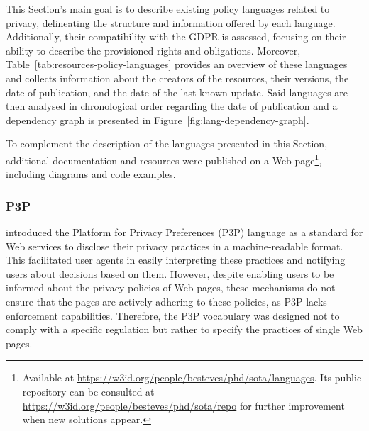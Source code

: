 This Section's main goal is to describe existing policy languages related to privacy, delineating the structure and information offered by each language.
Additionally, their compatibility with the GDPR is assessed, focusing on their ability to describe the provisioned rights and obligations.
Moreover, Table~\ref{tab:resources-policy-languages} provides an overview of these languages and collects information about the creators of the resources, their versions, the date of publication, and the date of the last known update.
Said languages are then analysed in chronological order regarding the date of publication and a dependency graph is presented in Figure~\ref{fig:lang-dependency-graph}.

To complement the description of the languages presented in this Section, additional documentation and resources were published on a Web page\footnote{Available at \url{https://w3id.org/people/besteves/phd/sota/languages}. Its public repository can be consulted at \url{https://w3id.org/people/besteves/phd/sota/repo} for further improvement when new solutions appear.}, including diagrams and code examples.

\subsubsection{P3P}
\label{sec:p3p}

\cite{cranor_platform_2002} introduced the Platform for Privacy Preferences (P3P) language as a standard for Web services to disclose their privacy practices in a machine-readable format.
This facilitated user agents in easily interpreting these practices and notifying users about decisions based on them. 
However, despite enabling users to be informed about the privacy policies of Web pages, these mechanisms do not ensure that the pages are actively adhering to these policies, as P3P lacks enforcement capabilities.
Therefore, the P3P vocabulary was designed not to comply with a specific regulation but rather to specify the practices of single Web pages.


